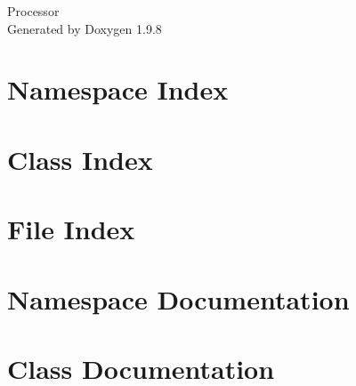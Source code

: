 \documentclass[twoside]{book}
\newcommand{\+}{\discretionary{\mbox{\scriptsize$\hookleftarrow$}}{}{}}
\newcommand{\clearemptydoublepage}{%
    \newpage{\pagestyle{empty}\cleardoublepage}%
  }
\begin{document}
  \raggedbottom
    \hypersetup{pageanchor=false,
                bookmarksnumbered=true,
                pdfencoding=unicode
               }
  \begin{titlepage}
  \vspace*{7cm}
  \begin{center}%
  {\Large Processor}\\
  \vspace*{1cm}
  {\large Generated by Doxygen 1.9.8}\\
  \end{center}
  \end{titlepage}
  \clearemptydoublepage
  \tableofcontents
  \clearemptydoublepage
  \hypersetup{pageanchor=true}

\chapter{Namespace Index}

\chapter{Class Index}

\chapter{File Index}

\chapter{Namespace Documentation}


\chapter{Class Documentation}























\end{document}
